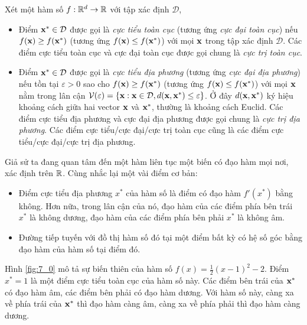 \def\mcd{\mathcal{D}}
\def\mcv{\mathcal{V}}
Xét một hàm số $f: \mathbb{R}^d \rightarrow \mathbb{R}$ với tập xác định $\mcd$,
\begin{itemize}
\item Điểm $\bx^* \in \mcd$ được gọi là \textit{cực tiểu toàn cục} (tương ứng \textit{cực đại toàn cục}) nếu $f(\mathbf{x}) \geq f(\mathbf{x}^*)$ (tương ứng $f(\mathbf{x}) \leq f(\mathbf{x}^*)$) với mọi $\mathbf{x}$ trong tập xác định $\mcd$. Các điểm cực tiểu toàn cục và cực đại toàn cục được gọi chung là \textit{cực trị toàn cục}.


\item Điểm $\bx^* \in \mcd$ được gọi là \textit{cực tiểu địa phương} (tương ứng \textit{cực đại địa phương}) nếu tồn tại $\varepsilon > 0$ sao cho $f(\mathbf{x}) \geq f(\mathbf{x}^*)$ (tương ứng $f(\mathbf{x}) \leq f(\mathbf{x}^*)$) với mọi $\mathbf{x}$ nằm trong lân cận $\mcv(\varepsilon) = \{\bx: \bx \in \mcd, d(\bx, \bx^*) \leq \varepsilon\}$. Ở đây $d(\mathbf{x}, \mathbf{x}^*)$ ký hiệu khoảng cách giữa hai vector $\mathbf{x}$ và $\mathbf{x}^*$, thường là khoảng cách Euclid. Các điểm cực tiểu địa phương và cực đại địa phương được gọi chung là \textit{cực trị địa phương}. Các điểm cực tiểu/cực đại/cực trị toàn cục cũng là các điểm cực tiểu/cực đại/cực trị địa phương.
\end{itemize}




Giả sử ta đang quan tâm đến một hàm liên tục một biến có đạo hàm mọi nơi, xác
định trên $\mathbb{R}$. Cùng nhắc lại một vài điểm cơ bản:
\begin{itemize}
\item Điểm cực tiểu địa phương $x^*$ của hàm số là điểm có đạo hàm $f'(x^*)$
bằng không. Hơn nữa, trong lân cận của nó, đạo hàm của các điểm phía bên
trái $x^*$ là không dương, đạo hàm của các điểm phía bên phải $x^*$ là không
âm.

\item Đường tiếp tuyến với đồ thị hàm số đó tại một điểm bất kỳ có hệ số góc
bằng đạo hàm của hàm số tại điểm đó.
\end{itemize}

Hình \ref{fig:7_0} mô tả sự biến thiên của hàm số $f(x) = \frac{1}{2}(x - 1)^2 -
2$. Điểm $x^* = 1$ là một điểm cực tiểu toàn cục của hàm số này. Các điểm bên
trái của $\mathbf{x}^*$ có đạo hàm âm, các điểm bên phải có đạo hàm dương. Với
hàm số này, càng xa về phía trái của $\mathbf{x}^*$ thì đạo hàm càng âm, càng xa về
phía phải thì đạo hàm càng dương.


